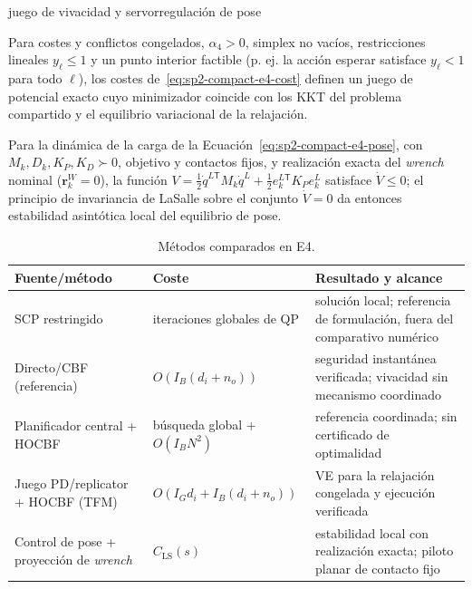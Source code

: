 \begin{contribucion}{juego de vivacidad y servorregulación de pose}
\begin{proposicion}
\label{prop:sp2-compact-e4-potential}
Para costes y conflictos congelados, $\alpha_4>0$, simplex no vacíos, restricciones lineales $y_\ell\leq1$ y un punto interior factible (p. ej. la acción esperar satisface $y_\ell<1$ para todo $\ell$), los costes de~\eqref{eq:sp2-compact-e4-cost} definen un juego de potencial exacto cuyo minimizador coincide con los KKT del problema compartido y el equilibrio variacional de la relajación.
\end{proposicion}
\begin{teorema}
\label{thm:sp2-compact-e4-pose}
Para la dinámica de la carga de la Ecuación~\eqref{eq:sp2-compact-e4-pose}, con $M_k,D_k,K_P,K_D\succ0$, objetivo y contactos fijos, y realización exacta del \emph{wrench} nominal ($\boldsymbol r_k^W=0$), la función $V=\tfrac12\dot q^{L\mathsf T}M_k\dot q^L+\tfrac12e_k^{L\mathsf T}K_Pe_k^L$ satisface $\dot V\leq0$; el principio de invariancia de LaSalle sobre el conjunto $\dot V=0$ da entonces estabilidad asintótica local del equilibrio de pose.
\end{teorema}
\end{contribucion}

\begin{table}[!htbp]
  \centering
  \caption{Métodos comparados en E4.}
  \label{tab:sp2-compact-e4-methods}
  \fontsize{7.6}{8.6}\selectfont
  \setlength{\tabcolsep}{2.2pt}
  \renewcommand{\arraystretch}{1.08}
  \begin{tabularx}{\textwidth}{>{\raggedright\arraybackslash}p{3.0cm} >{\raggedright\arraybackslash}p{2.0cm} Y}
    \toprule
    Fuente/método & Coste & Resultado y alcance \\
    \midrule
    SCP restringido \parencite{alonsomora2017transport} & iteraciones globales de QP & solución local; referencia de formulación, fuera del comparativo numérico \\
    Directo/CBF (referencia) & $O(I_B(d_i+n_o))$ & seguridad instantánea verificada; vivacidad sin mecanismo coordinado \\
    Planificador central + HOCBF & búsqueda global + $O(I_BN^2)$ & referencia coordinada; sin certificado de optimalidad \\
    Juego PD/replicator + HOCBF (TFM) & $O(I_Gd_i+I_B(d_i+n_o))$ & VE para la relajación congelada y ejecución verificada \\
    Control de pose + proyección de \emph{wrench} & $C_{\mathrm{LS}}(s)$ & estabilidad local con realización exacta; piloto planar de contacto fijo \\
    \bottomrule
  \end{tabularx}
\end{table}

